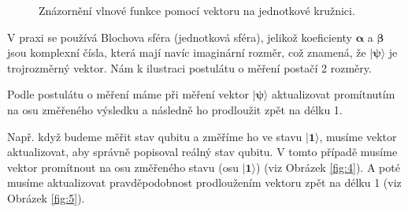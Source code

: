 \begin{figure}[ht]

    \centering

    \caption{\label{fig:3}Znázornění vlnové funkce pomocí vektoru na jednotkové kružnici.}
\end{figure}


V praxi se používá Blochova sféra (jednotková sféra), jelikož koeficienty $\bm{\alpha}$ a $\bm{\beta}$ jsou komplexní čísla, která mají navíc imaginární rozměr, což znamená, že $\bm{|\psi\rangle}$ je trojrozměrný vektor. Nám k ilustraci postulátu o měření postačí 2 rozměry.

Podle postulátu o měření máme při měření vektor $\bm{|\psi\rangle}$ aktualizovat promítnutím na osu změře\-ného výsledku a následně ho prodloužit zpět na délku 1.

Např. když budeme měřit stav qubitu a změříme ho ve stavu $\bm{|1\rangle}$, musíme vektor aktualizovat, aby správně popisoval reálný stav qubitu. V tomto případě musíme vektor promítnout na osu změřeného stavu (osu $\bm{|1\rangle}$) (viz Obrázek \ref{fig:4}). A poté musíme aktualizovat pravděpodobnost prodloužením vektoru zpět na délku 1 (viz Obrázek \ref{fig:5}).

